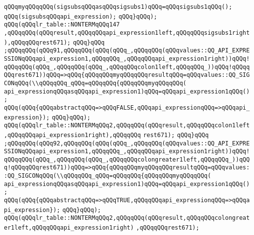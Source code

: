 \verb|qQQqmyqQQqqQQq(sigsubsqQQqasqQQqsigsubs1)qQQq=qQQqsigsubs1qQQq();|\newline
\verb|qQQq(sigsubsqQQqapi_expression);|\newline
\verb|qQQq}qQQq);|\newline
\verb|qQQq(qQQqlr_table::NONTERMqQQq147|\newline
\verb|,qQQqqQQq(qQQqresult,qQQqqQQqapi_expression1left,qQQqqQQqsigsubs1right),qQQqqQQqrest671);|\newline
\verb|qQQq}qQQq|\newline
\verb|;qQQqqQQq(qQQq91,qQQqqQQq(qQQq(qQQq_,qQQqqQQq(qQQqvalues::QQ_API_EXPRESSIONqQQqapi_expression1,qQQqqQQq_,qQQqqQQqapi_expression1right))qQQq!qQQqqQQq(qQQq_,qQQqqQQq(qQQq_,qQQqqQQqcolon1left,qQQqqQQq_))qQQq!qQQqqQQqrest671))qQQq=>qQQq{qQQqqQQqmyqQQqqQQqresultqQQq=qQQqvalues::QQ_SIGCONqQQq(\\qQQqqQQq_qQQq=qQQqqQQq{qQQqqQQqmyqQQqqQQq(|\newline
\verb|api_expressionqQQqasqQQqapi_expression1)qQQq=qQQqapi_expression1qQQq();|\newline
\verb|qQQq(qQQq{qQQqabstractqQQq=>qQQqFALSE,qQQqapi_expressionqQQq=>qQQqapi_expression});|\newline
\verb|qQQq}qQQq);|\newline
\verb|qQQq(qQQqlr_table::NONTERMqQQq2,qQQqqQQq(qQQqresult,qQQqqQQqcolon1left,qQQqqQQqapi_expression1right),qQQqqQQq|\newline
\verb|rest671);|\newline
\verb|qQQq}qQQq|\newline
\verb|;qQQqqQQq(qQQq92,qQQqqQQq(qQQq(qQQq_,qQQqqQQq(qQQqvalues::QQ_API_EXPRESSIONqQQqapi_expression1,qQQqqQQq_,qQQqqQQqapi_expression1right))qQQq!qQQqqQQq(qQQq_,qQQqqQQq(qQQq_,qQQqqQQqcolongreater1left,qQQqqQQq_))qQQq!qQQqqQQqrest671))qQQq=>qQQq{qQQqqQQqmyqQQqqQQqresultqQQq=qQQqvalues::QQ_SIGCONqQQq(\\qQQqqQQq_qQQq=qQQqqQQq{qQQqqQQqmyqQQqqQQq(|\newline
\verb|api_expressionqQQqasqQQqapi_expression1)qQQq=qQQqapi_expression1qQQq();|\newline
\verb|qQQq(qQQq{qQQqabstractqQQq=>qQQqTRUE,qQQqqQQqapi_expressionqQQq=>qQQqapi_expression});|\newline
\verb|qQQq}qQQq);|\newline
\verb|qQQq(qQQqlr_table::NONTERMqQQq2,qQQqqQQq(qQQqresult,qQQqqQQqcolongreater1left,qQQqqQQqapi_expression1right)|\newline
\verb|,qQQqqQQqrest671);|\newline
